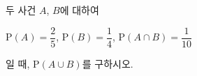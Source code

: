 두 사건 $A$, $B$에 대하여\par\smallskip\noindent\hspace*{1.5em}$\mathrm{P}(A)=\dfrac{2}{5}$, $\mathrm{P}(B)=\dfrac{1}{4}$, $\mathrm{P}(A\cap B)=\dfrac{1}{10}$\par\smallskip\noindent 일 때, $\mathrm{P}(A\cup B)$를 구하시오.
